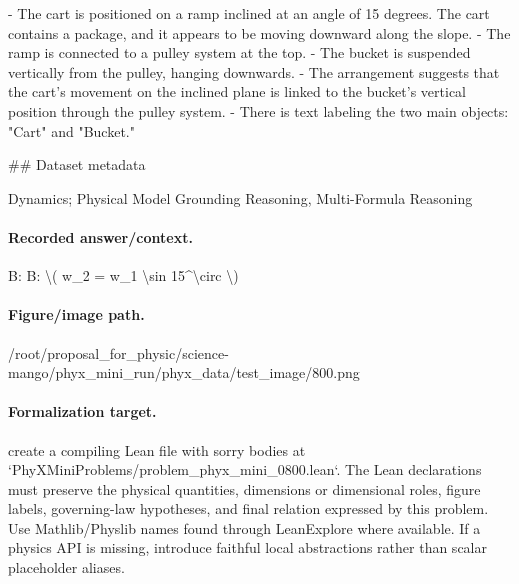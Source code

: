 - The cart is positioned on a ramp inclined at an angle of 15 degrees. The cart contains a package, and it appears to be moving downward along the slope.
- The ramp is connected to a pulley system at the top.
- The bucket is suspended vertically from the pulley, hanging downwards.
- The arrangement suggests that the cart's movement on the inclined plane is linked to the bucket's vertical position through the pulley system.
- There is text labeling the two main objects: "Cart" and "Bucket."

\#\# Dataset metadata

Dynamics; Physical Model Grounding Reasoning, Multi-Formula Reasoning

\paragraph{Recorded answer/context.}
B: B: \textbackslash{}( w\_2 = w\_1 \textbackslash{}sin 15\textasciicircum{}\textbackslash{}circ \textbackslash{})

\paragraph{Figure/image path.}
/root/proposal\_for\_physic/science-mango/phyx\_mini\_run/phyx\_data/test\_image/800.png

\paragraph{Formalization target.}
create a compiling Lean file with sorry bodies at `PhyXMiniProblems/problem\_phyx\_mini\_0800.lean`. The Lean declarations must preserve the physical quantities, dimensions or dimensional roles, figure labels, governing-law hypotheses, and final relation expressed by this problem.
Use Mathlib/Physlib names found through LeanExplore where available. If a physics API is missing, introduce faithful local abstractions rather than scalar placeholder aliases.

